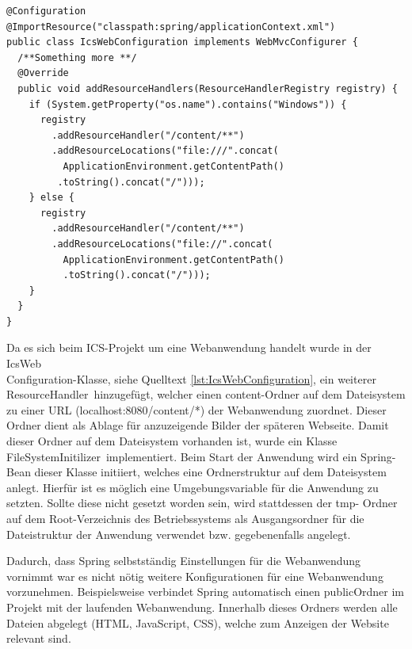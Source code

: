 \lstset{language=Java}
\begin{lstlisting}[caption={IcsWebConfiguration.java}, label={lst:IcsWebConfiguration}]
@Configuration
@ImportResource("classpath:spring/applicationContext.xml")
public class IcsWebConfiguration implements WebMvcConfigurer {
  /**Something more **/
  @Override
  public void addResourceHandlers(ResourceHandlerRegistry registry) {
    if (System.getProperty("os.name").contains("Windows")) {
	  registry
	    .addResourceHandler("/content/**")
		.addResourceLocations("file:///".concat(
		  ApplicationEnvironment.getContentPath()
		 .toString().concat("/")));
	} else {
	  registry
	    .addResourceHandler("/content/**")
		.addResourceLocations("file://".concat(
		  ApplicationEnvironment.getContentPath()
		  .toString().concat("/")));
	}
  }
}
\end{lstlisting}

	Da es sich beim \ac{ICS}-Projekt um eine Webanwendung handelt wurde in der \glqq IcsWeb\\Configuration\grqq -Klasse, siehe Quelltext \ref{lst:IcsWebConfiguration}, ein weiterer \glqq ResourceHandler\grqq \, hinzugefügt, welcher einen \glqq content\grqq-Ordner auf dem Dateisystem zu einer URL (\glqq localhost:8080/content/*\grqq) der Webanwendung zuordnet. Dieser Ordner dient als Ablage für anzuzeigende Bilder der späteren Webseite. Damit dieser Ordner auf dem Dateisystem vorhanden ist, wurde ein Klasse \glqq FileSystemInitilizer\grqq \, implementiert. Beim Start der Anwendung wird ein Spring-Bean dieser Klasse initiiert, welches eine Ordnerstruktur auf dem Dateisystem anlegt. Hierfür ist es möglich eine Umgebungsvariable für die Anwendung zu setzten. Sollte diese nicht gesetzt worden sein, wird stattdessen der \glqq tmp\grqq- Ordner auf dem Root-Verzeichnis des Betriebssystems als Ausgangsordner für die Dateistruktur der Anwendung verwendet bzw. gegebenenfalls angelegt.
	
	Dadurch, dass Spring selbstständig Einstellungen für die Webanwendung vornimmt war es nicht nötig weitere Konfigurationen für eine Webanwendung vorzunehmen. Beispielsweise verbindet Spring automatisch einen \glqq public\grqq Ordner im Projekt mit der laufenden Webanwendung. Innerhalb dieses Ordners werden alle Dateien abgelegt (HTML, JavaScript, CSS), welche zum Anzeigen der Website relevant sind.

